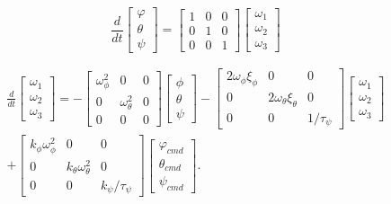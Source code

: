 \begin{equation}
\frac{d}{d t}\left[\begin{array}{l}
\varphi \\
\theta \\
\psi
\end{array}\right]=\left[\begin{array}{lll}
1 & 0 & 0 \\
0 & 1 & 0 \\
0 & 0 & 1
\end{array}\right]\left[\begin{array}{l}
\omega_{1} \\
\omega_{2} \\
\omega_{3}
\end{array}\right]
\end{equation}

\begin{equation}
\begin{aligned}
\frac{d}{d t}\left[\begin{array}{l}
\omega_{1} \\
\omega_{2} \\
\omega_{3}
\end{array}\right]=-\left[\begin{array}{ccc}
\omega_{\phi}^{2} & 0 & 0 \\
0 & \omega_{\theta}^{2} & 0 \\
0 & 0 & 0
\end{array}\right]\left[\begin{array}{l}
\phi \\
\theta \\
\psi
\end{array}\right]-\left[\begin{array}{ccc}
2 \omega_{\phi} \xi_{\phi} & 0 & 0 \\
0 & 2 \omega_{\theta} \xi_{\theta} & 0 \\
0 & 0 & 1 / \tau_{\psi}
\end{array}\right]\left[\begin{array}{l}
\omega_{1} \\
\omega_{2} \\
\omega_{3}
\end{array}\right] \\
+ {\left[\begin{array}{ccc}
k_{\phi} \omega_{\phi}^{2} & 0 & 0 \\
0 & k_{\theta} \omega_{\theta}^{2} & 0 \\
0 & 0 & k_{\psi} / \tau_{\psi}
\end{array}\right]\left[\begin{array}{c}
\varphi_{c m d} \\
\theta_{c m d} \\
\psi_{c m d}
\end{array}\right] . }
\end{aligned}
\end{equation}


